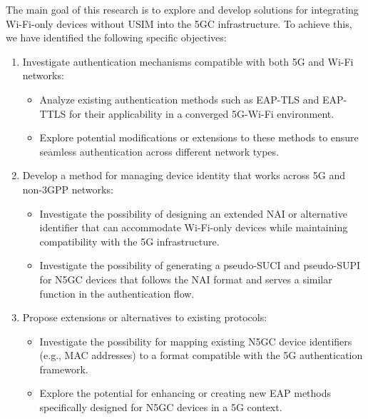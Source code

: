 
The main goal of this research is to explore and develop solutions for integrating Wi-Fi-only devices without \ac{USIM} into the \ac{5GC} infrastructure. To achieve this, we have identified the following specific objectives:

\begin{enumerate}
    \item{
        Investigate authentication mechanisms compatible with both \ac{5G} and Wi-Fi networks:
        \begin{itemize}
            \item Analyze existing authentication methods such as \ac{EAP-TLS} and \ac{EAP-TTLS} for their applicability in a converged \ac{5G}-Wi-Fi environment.
            \item Explore potential modifications or extensions to these methods to ensure seamless authentication across different network types.
        \end{itemize}
    }
    \item{
        Develop a method for managing device identity that works across \ac{5G} and non-\ac{3GPP} networks:
        \begin{itemize}
            \item Investigate the possibility of designing an extended \ac{NAI} or alternative identifier that can accommodate Wi-Fi-only devices while maintaining compatibility with the \ac{5G} infrastructure.
            \item Investigate the possibility of generating a pseudo-\ac{SUCI} and pseudo-\ac{SUPI} for \ac{N5GC} devices that follows the \ac{NAI} format and serves a similar function in the authentication flow.
        \end{itemize}
    }
    \item{
        Propose extensions or alternatives to existing protocols:
        \begin{itemize}
            \item Investigate the possibility for mapping existing \ac{N5GC} device identifiers (e.g., \ac{MAC} addresses) to a format compatible with the \ac{5G} authentication framework.
            \item Explore the potential for enhancing or creating new \ac{EAP} methods specifically designed for \ac{N5GC} devices in a \ac{5G} context.
        \end{itemize}
    }
\end{enumerate}

